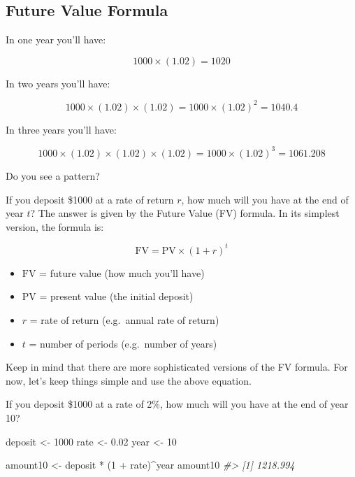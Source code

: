 \documentclass[
]{book}
\newenvironment{Shaded}{\begin{snugshade}}{\end{snugshade}}
\newcommand{\CommentTok}[1]{\textcolor[rgb]{0.56,0.35,0.01}{\textit{#1}}}
\newcommand{\DecValTok}[1]{\textcolor[rgb]{0.00,0.00,0.81}{#1}}
\newcommand{\FloatTok}[1]{\textcolor[rgb]{0.00,0.00,0.81}{#1}}
\newcommand{\NormalTok}[1]{#1}
\newcommand{\OtherTok}[1]{\textcolor[rgb]{0.56,0.35,0.01}{#1}}
\newcommand{\SpecialCharTok}[1]{\textcolor[rgb]{0.00,0.00,0.00}{#1}}
\begin{document}
\hypertarget{future-value-formula}{%
\subsection{Future Value Formula}\label{future-value-formula}}

In one year you'll have:

\[
1000 \times (1.02) = 1020
\]

In two years you'll have:

\[
1000 \times (1.02) \times (1.02) = 1000 \times (1.02)^2 = 1040.4
\]

In three years you'll have:

\[
1000 \times (1.02) \times (1.02) \times (1.02) = 1000 \times (1.02)^3 = 1061.208
\]

Do you see a pattern?

If you deposit \$1000 at a rate of return \(r\), how much will you have at the
end of year \(t\)? The answer is given by the Future Value (FV) formula. In its
simplest version, the formula is:

\[
\text{FV} = \text{PV} \times (1 + r)^t
\]

\begin{itemize}
\item
  \(\text{FV}\) = future value (how much you'll have)
\item
  \(\text{PV}\) = present value (the initial deposit)
\item
  \(r\) = rate of return (e.g.~annual rate of return)
\item
  \(t\) = number of periods (e.g.~number of years)
\end{itemize}

Keep in mind that there are more sophisticated versions of the FV formula.
For now, let's keep things simple and use the above equation.

If you deposit \$1000 at a rate of 2\%, how much will you have at the end of
year 10?

\begin{Shaded}
\begin{Highlighting}[]
\NormalTok{deposit }\OtherTok{\textless{}{-}} \DecValTok{1000}
\NormalTok{rate }\OtherTok{\textless{}{-}} \FloatTok{0.02}
\NormalTok{year }\OtherTok{\textless{}{-}} \DecValTok{10}

\NormalTok{amount10 }\OtherTok{\textless{}{-}}\NormalTok{ deposit }\SpecialCharTok{*}\NormalTok{ (}\DecValTok{1} \SpecialCharTok{+}\NormalTok{ rate)}\SpecialCharTok{\^{}}\NormalTok{year}
\NormalTok{amount10}
\CommentTok{\#\textgreater{} [1] 1218.994}
\end{Highlighting}
\end{Shaded}
\end{document}
